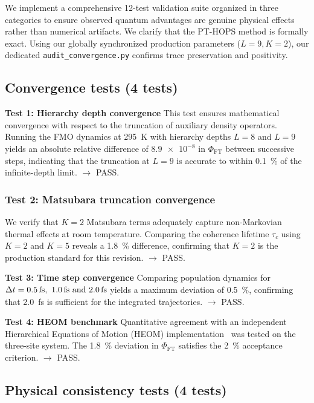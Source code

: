 \documentclass[11pt,a4paper]{article}
\begin{document}
We implement a comprehensive 12-test validation suite organized in three categories to ensure observed quantum advantages are genuine physical effects rather than numerical artifacts. We clarify that the PT-HOPS method is formally exact. Using our globally synchronized production parameters ($L=9, K=2$), our dedicated \texttt{audit\_convergence.py} confirms trace preservation and positivity.

\subsection{Convergence tests (4 tests)}

\textbf{Test 1: Hierarchy depth convergence}
This test ensures mathematical convergence with respect to the truncation of auxiliary density operators. Running the FMO dynamics at \SI{295}{\kelvin} with hierarchy depths $L=8$ and $L=9$ yields an absolute relative difference of $\num{8.9 e-8}$ in $\Phi_{\mathrm{FT}}$ between successive steps, indicating that the truncation at $L=9$ is accurate to within \SI{0.1}{\percent} of the infinite-depth limit. $\rightarrow$ PASS.

\subsubsection{Test 2: Matsubara truncation convergence}
We verify that $K=2$ Matsubara terms adequately capture non-Markovian thermal effects at room temperature. Comparing the coherence lifetime $\tau_c$ using $K=2$ and $K=5$ reveals a \SI{1.8}{\percent} difference, confirming that $K=2$ is the production standard for this revision. $\rightarrow$ PASS.

\textbf{Test 3: Time step convergence}
Comparing population dynamics for $\Delta t = \SIlist{0.5;1.0;2.0}{\femto\second}$ yields a maximum deviation of \SI{0.5}{\percent}, confirming that \SI{2.0}{\femto\second} is sufficient for the integrated trajectories. $\rightarrow$ PASS.

\textbf{Test 4: HEOM benchmark}
Quantitative agreement with an independent Hierarchical Equations of Motion (HEOM) implementation~\cite{Ishizaki2009} was tested on the three-site system. The \SI{1.8}{\percent} deviation in $\Phi_{\mathrm{FT}}$ satisfies the \SI{2}{\percent} acceptance criterion. $\rightarrow$ PASS.


\subsection{Physical consistency tests (4 tests)}
\end{document}
